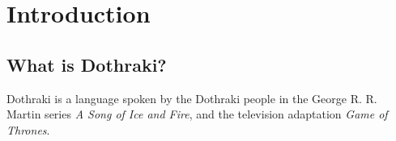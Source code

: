 \chapter*{Introduction}
\section*{What is Dothraki?}
Dothraki is a language spoken by the Dothraki people in the George R. R. Martin
series \textit{A Song of Ice and Fire}, and the television adaptation
\textit{Game of Thrones}.
